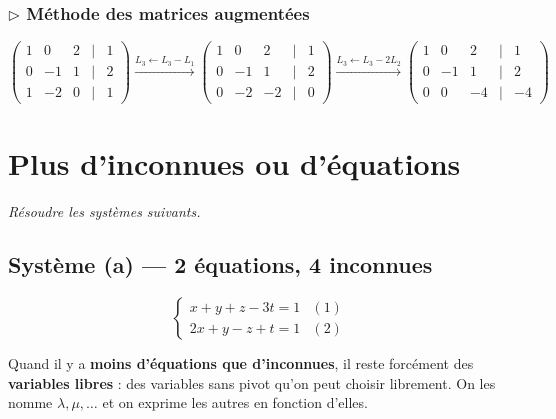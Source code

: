 \documentclass[12pt,a4paper]{article}
\begin{document}
\subsubsection*{$\triangleright$ Méthode des matrices augmentées}

\[
\begin{pmatrix}
1 & 0 & 2 & \mid & 1 \\
0 & -1 & 1 & \mid & 2 \\
1 & -2 & 0 & \mid & 1
\end{pmatrix}
\xrightarrow{L_3 \leftarrow L_3 - L_1}
\begin{pmatrix}
1 & 0 & 2 & \mid & 1 \\
0 & -1 & 1 & \mid & 2 \\
0 & -2 & -2 & \mid & 0
\end{pmatrix}
\xrightarrow{L_3 \leftarrow L_3 - 2L_2}
\begin{pmatrix}
1 & 0 & 2 & \mid & 1 \\
0 & -1 & 1 & \mid & 2 \\
0 & 0 & -4 & \mid & -4
\end{pmatrix}
\]

\section{Plus d'inconnues ou d'équations}

\textit{Résoudre les systèmes suivants.}

\subsection{Système (a) --- 2 équations, 4 inconnues}

\[
\begin{cases}
  x + y + z - 3t = 1 & (1)\\
  2x + y - z + t = 1 & (2)
\end{cases}
\]

\begin{methode}
Quand il y a \textbf{moins d'équations que d'inconnues}, il reste forcément des \textbf{variables libres} : des variables sans pivot qu'on peut choisir librement. On les nomme $\lambda, \mu, \ldots$ et on exprime les autres en fonction d'elles.
\end{methode}
\end{document}
